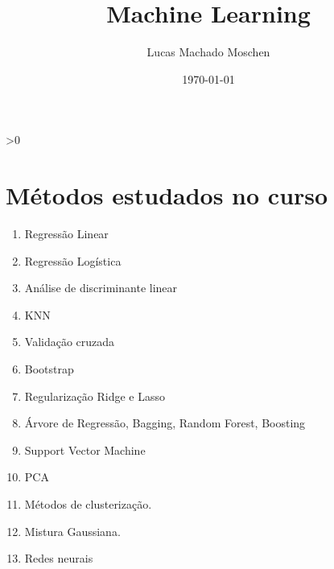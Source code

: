 \documentclass[10pt, twocolumn]{article}
\title{Machine Learning}
\author{Lucas Machado Moschen}
\affil{School of Applied Mathematics, \\ Fundação Getulio Vargas}
\date{\today}
\begin{document}
\setcounter{num}{0}

\twocolumn[
    \begin{@twocolumnfalse}

        \maketitle

        \begin{abstract}
            
        \end{abstract}

        \vspace{1cm}

    \end{@twocolumnfalse}
]

\ifnum \value{num}>0
    {
    
    
    
    }
\else 
    {
    
    
    
    
    
    
    }
\fi

\newpage

\section*{Métodos estudados no curso}

\begin{enumerate}
    \item Regressão Linear
    \item Regressão Logística 
    \item Análise de discriminante linear 
    \item KNN
    \item Validação cruzada 
    \item Bootstrap
    \item Regularização Ridge e Lasso
    \item Árvore de Regressão, Bagging, Random Forest, Boosting 
    \item Support Vector Machine
    \item PCA 
    \item Métodos de clusterização. 
    \item Mistura Gaussiana.
    \item Redes neurais
\end{enumerate}

    \newpage



\twocolumn[
    \begin{@twocolumnfalse}
         
    \end{@twocolumnfalse}
]
\end{document}
